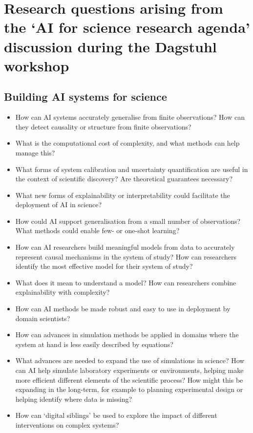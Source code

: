 
\section{Research
questions arising from the `AI for science research agenda' discussion
during the Dagstuhl workshop}

\subsection*{Building AI systems for science}

\begin{itemize}
\item
  How can AI systems accurately generalise from finite observations? How
  can they detect causality or structure from finite observations?
\item
  What is the computational cost of complexity, and what methods can
  help manage this?
\item
  What forms of system calibration and uncertainty quantification are
  useful in the context of scientific discovery? Are theoretical
  guarantees necessary?
\item
  What new forms of explainability or interpretability could facilitate
  the deployment of AI in science?
\item
  How could AI support generalisation from a small number of
  observations? What methods could enable few- or one-shot learning?
\item
  How can AI researchers build meaningful models from data to accurately
  represent causal mechanisms in the system of study? How can
  researchers identify the most effective model for their system of
  study?
\item
  What does it mean to understand a model? How can researchers combine
  explainability with complexity?
\item
  How can AI methods be made robust and easy to use in deployment by
  domain scientists?
\item
  How can advances in simulation methods be applied in domains where the
  system at hand is less easily described by equations?
\item
  What advances are needed to expand the use of simulations in science?
  How can AI help simulate laboratory experiments or environments,
  helping make more efficient different elements of the scientific
  process? How might this be expanding in the long-term, for example to
  planning experimental design or helping identify where data is
  missing?
\item
  How can `digital siblings' be used to explore the impact of different
  interventions on complex systems?
\end{itemize}

